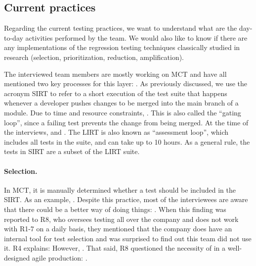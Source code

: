 \subsection{Current practices}

Regarding the current testing practices, we want to understand what are the day-to-day activities performed by the team.
We would also like to know if there are any implementations of the regression testing techniques classically studied in research (selection, prioritization, reduction, amplification).

The interviewed team members are mostly working on MCT and have all mentioned two key processes for this layer: .
As previously discussed, we use the acronym SIRT to refer to a short execution of the test suite that happens whenever a developer pushes changes to be merged into the main branch of a module.
Due to time and resource constraints, .
This is also called the ``gating loop'', since a failing test prevents the change from being merged.
At the time of the interviews,  and .
The LIRT is also known as ``assessment loop'', which includes all tests in the suite, and can take up to 10 hours.
As a general rule, the tests in SIRT are a subset of the LIRT suite.

\paragraph{Selection.} In MCT, it is manually determined whether a test should be included in the SIRT. As an example, .
Despite this practice, most of the interviewees are aware that there could be a better way of doing things: .
When this finding was reported to R8, who oversees testing all over the company and does not work with R1-7 on a daily basis, they mentioned that the company does have an internal tool for test selection and was surprised to find out this team did not use it.
R4 explains:  
However, .
That said, R8 questioned the necessity of \tcs in a well-designed agile production: .

